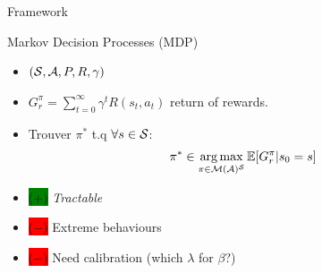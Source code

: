 \documentclass{beamer}
\newcommand{\cplus}{\colorbox{green}{($+$)} }
\newcommand{\cmoins}{\colorbox{red}{($-$)} }
\begin{document}
    \begin{frame}{Framework}
        \begin{block}{Markov Decision Processes (MDP)}
            \begin{itemize}
                \item $(\mathcal{S}, \mathcal{A}, P, R, \gamma)$
                \item $G_r^\pi = \sum_{t=0}^\infty \gamma^t R(s_t, a_t)$ return of rewards.
                \item Trouver $\pi^*$ t.q $\forall s\in\mathcal{S}$:
                \begin{equation}
                    \label{eq:mdp}
                    \begin{array}{lcr}
                        \displaystyle \pi^* \in \operatorname*{arg\,max}_{\pi\in\mathcal{M}(\mathcal{A})^{\mathcal{S}}} \operatorname*{\mathbb{E}}[G_r^\pi | s_0=s]
                    \end{array}
                \end{equation}

            \end{itemize}
        \end{block}


        \begin{block}{}
            \begin{itemize}
                \item \cplus \textit{Tractable}
                \item \cmoins Extreme behaviours
                \item \cmoins Need calibration (which $\lambda$ for $\beta$?)
            \end{itemize}
        \end{block}

    \end{frame}
\end{document}
